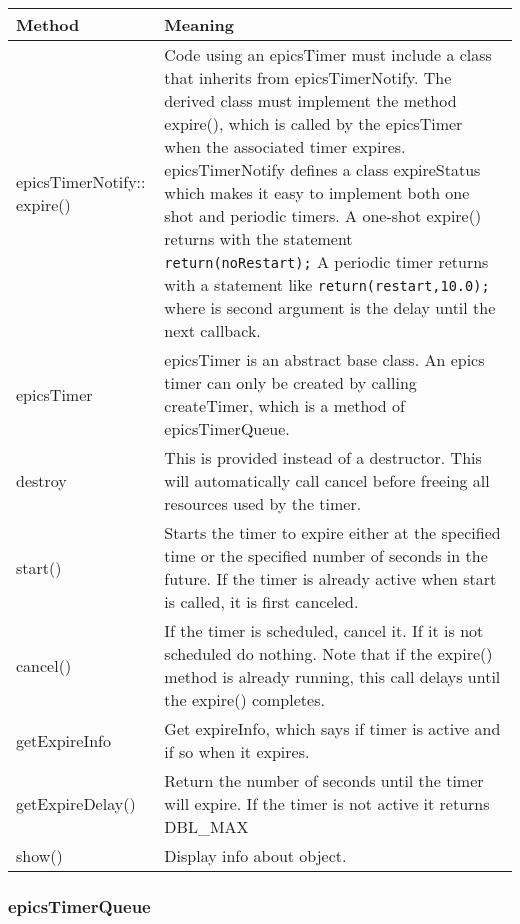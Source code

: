 \begin{center}
\begin{longtable}{p{1.1in}p{5.0in}}
\textbf{Method} & \textbf{Meaning}\\
\hline
epicsTimerNotify:: expire() &
Code using an epicsTimer must include a class that inherits from epicsTimerNotify.
The derived class must implement the method expire(), which is called by the epicsTimer when the associated timer expires.
epicsTimerNotify defines a class expireStatus which makes it easy to implement both one shot and periodic timers.
A one-shot expire() returns with the statement \verb|return(noRestart);|
A periodic timer returns with a statement like \verb|return(restart,10.0);| where is second argument is the delay until the next callback.\\

epicsTimer &
epicsTimer is an abstract base class.
An epics timer can only be created by calling createTimer, which is a method of epicsTimerQueue.\\

destroy &
This is provided instead of a destructor.
This will automatically call cancel before freeing all resources used by the timer.\\

start() &
Starts the timer to expire either at the specified time or the specified number of seconds in the future.
If the timer is already active when start is called, it is first canceled.\\

cancel() &
If the timer is scheduled, cancel it.
If it is not scheduled do nothing.
Note that if the expire() method is already running, this call delays until the expire() completes.\\

getExpireInfo &
Get expireInfo, which says if timer is active and if so when it expires.\\

getExpireDelay() &
Return the number of seconds until the timer will expire.
If the timer is not active it returns DBL\_MAX\\

show() &
Display info about object.
\end{longtable}

\end{center}


\subsubsection{epicsTimerQueue}


